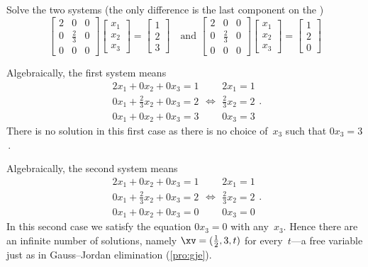 \begin{example} 
Solve the two systems (the only difference is the last component on the \rhs)
\begin{equation*}
\begin{bmatrix} 2&0&0\\0&\frac23&0\\0&0&0 \end{bmatrix}
\begin{bmatrix} x_1\\x_2\\x_3 \end{bmatrix}
=\begin{bmatrix} 1\\2\\3 \end{bmatrix}
\quad\text{and }
\begin{bmatrix} 2&0&0\\0&\frac23&0\\0&0&0 \end{bmatrix}
\begin{bmatrix} x_1\\x_2\\x_3 \end{bmatrix}
=\begin{bmatrix} 1\\2\\0 \end{bmatrix}
\end{equation*}
\begin{solution}
Algebraically, the first system means
\begin{equation*}
\begin{array}{l} 2x_1+0x_2+0x_3=1
\\0x_1+\frac23x_2+0x_3=2
\\0x_1+0x_2+0x_3=3\end{array}
\iff
\begin{array}{l} 2x_1=1
\\\frac23x_2=2
\\0x_3=3\end{array}
.
\end{equation*}
There is no solution in this first case as there is no choice of~\(x_3\) such that \(0x_3=3\)\,.

Algebraically, the second system means
\begin{equation*}
\begin{array}{l} 2x_1+0x_2+0x_3=1
\\0x_1+\frac23x_2+0x_3=2
\\0x_1+0x_2+0x_3=0\end{array}
\iff
\begin{array}{l} 2x_1=1
\\\frac23x_2=2
\\0x_3=0\end{array}
.
\end{equation*}
In this second case we satisfy the equation \(0x_3=0\) with any~\(x_3\).
Hence there are an infinite number of solutions, namely \(\xv=(\frac12,3,t)\) for every~\(t\)---a free variable just as in Gauss--Jordan elimination (\cref{pro:gje}).
\end{solution}
\end{example}




